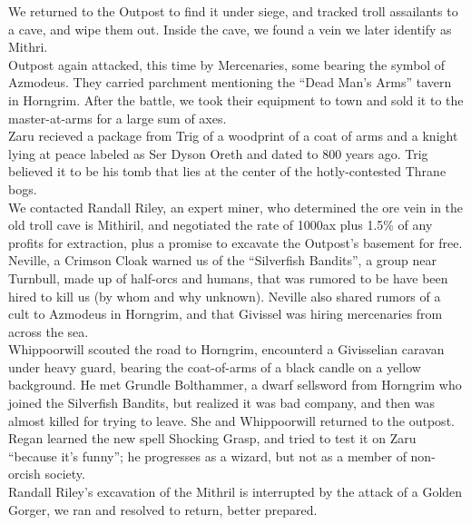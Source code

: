 \documentclass[letterpaper]{article}
\begin{document}
\noindent We returned to the Outpost to find it under siege, and tracked troll assailants to a cave, and wipe them out. Inside the cave, we found a vein we later identify as Mithri.\\

\noindent Outpost again attacked, this time by Mercenaries, some bearing the symbol of Azmodeus.  They carried parchment mentioning the ``Dead Man's Arms'' tavern in Horngrim.  After the battle, we took their equipment to town and sold it to the master-at-arms for a large sum of axes.\\

\noindent Zaru recieved a package from Trig of a woodprint of a coat of arms and a knight lying at peace labeled as Ser Dyson Oreth and dated to 800 years ago.  Trig believed it to be his tomb that lies at the center of the hotly-contested Thrane bogs.\\

\noindent We contacted Randall Riley, an expert miner, who determined the ore vein in the old troll cave is Mithiril, and negotiated the rate of 1000ax plus 1.5\% of any profits for extraction, plus a promise to excavate the Outpost's basement for free.\\

\noindent Neville, a Crimson Cloak warned us of the ``Silverfish Bandits'', a group near Turnbull, made up of half-orcs and humans, that was rumored to be have been hired to kill us (by whom and why unknown). Neville also shared rumors of a cult to Azmodeus in Horngrim, and that Givissel was hiring mercenaries from across the sea.\\

\noindent Whippoorwill scouted the road to Horngrim, encounterd a Givisselian caravan under heavy guard, bearing the coat-of-arms of a black candle on a yellow background.  He met Grundle Bolthammer, a dwarf sellsword from Horngrim who joined the Silverfish Bandits, but realized it was bad company, and then was almost killed for trying to leave. She and Whippoorwill returned to the outpost.\\

\noindent Regan learned the new spell Shocking Grasp, and tried to test it on Zaru ``because it's funny''; he progresses as a wizard, but not as a member of non-orcish society.\\

\noindent Randall Riley's excavation of the Mithril is interrupted by the attack of a Golden Gorger, we ran and resolved to return, better prepared.\\
\end{document}
